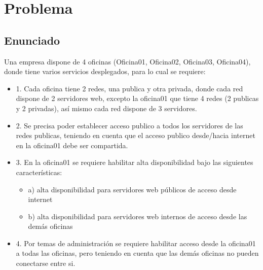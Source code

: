 \newpage
\section{Problema}
\subsection{Enunciado}
Una empresa dispone de 4 oficinas (Oficina01, Oficina02, Oficina03, Oficina04), donde tiene varios servicios desplegados, para lo cual se requiere:

\begin{itemize}
    \item 1. Cada oficina tiene 2 redes, una publica y otra privada, donde cada red dispone de 2 servidores web, excepto la oficina01 que tiene 4 redes (2 publicas y 2 privadas), así mismo cada red dispone de 3 servidores.
    \item 2. Se precisa poder establecer acceso publico a todos los servidores de las redes publicas, teniendo en cuenta que el acceso publico desde/hacia internet en la oficina01 debe ser compartida.
    \item 3. En la oficina01 se requiere habilitar alta disponibilidad bajo las siguientes características:
        \begin{itemize}
            \item a) alta disponibilidad para servidores web públicos de acceso desde internet
            \item b) alta disponibilidad para servidores web internos de acceso desde las demás oficinas
        \end{itemize}
    \item 4. Por temas de administración se requiere habilitar acceso desde la oficina01 a todas las oficinas, pero teniendo en cuenta que las demás oficinas no pueden conectarse entre si.
\end{itemize}